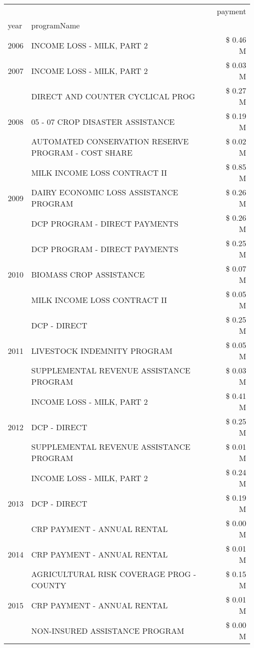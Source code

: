 \begin{tabular}{llr}
\toprule
 &  & payment \\
year & programName &  \\
\midrule
2006 & INCOME LOSS - MILK, PART 2 & \$ 0.46 M \\
\cline{1-3}
2007 & INCOME LOSS - MILK, PART 2 & \$ 0.03 M \\
\cline{1-3}
\multirow[t]{3}{*}{2008} & DIRECT AND COUNTER CYCLICAL PROG & \$ 0.27 M \\
 & 05 - 07 CROP DISASTER ASSISTANCE & \$ 0.19 M \\
 & AUTOMATED CONSERVATION RESERVE PROGRAM - COST SHARE & \$ 0.02 M \\
\cline{1-3}
\multirow[t]{3}{*}{2009} & MILK INCOME LOSS CONTRACT II & \$ 0.85 M \\
 & DAIRY ECONOMIC LOSS ASSISTANCE PROGRAM & \$ 0.26 M \\
 & DCP PROGRAM - DIRECT PAYMENTS & \$ 0.26 M \\
\cline{1-3}
\multirow[t]{3}{*}{2010} & DCP PROGRAM - DIRECT PAYMENTS & \$ 0.25 M \\
 & BIOMASS CROP ASSISTANCE & \$ 0.07 M \\
 & MILK INCOME LOSS CONTRACT II & \$ 0.05 M \\
\cline{1-3}
\multirow[t]{3}{*}{2011} & DCP - DIRECT & \$ 0.25 M \\
 & LIVESTOCK INDEMNITY PROGRAM & \$ 0.05 M \\
 & SUPPLEMENTAL REVENUE ASSISTANCE PROGRAM & \$ 0.03 M \\
\cline{1-3}
\multirow[t]{3}{*}{2012} & INCOME LOSS - MILK, PART 2 & \$ 0.41 M \\
 & DCP - DIRECT & \$ 0.25 M \\
 & SUPPLEMENTAL REVENUE ASSISTANCE PROGRAM & \$ 0.01 M \\
\cline{1-3}
\multirow[t]{3}{*}{2013} & INCOME LOSS - MILK, PART 2 & \$ 0.24 M \\
 & DCP - DIRECT & \$ 0.19 M \\
 & CRP PAYMENT - ANNUAL RENTAL & \$ 0.00 M \\
\cline{1-3}
2014 & CRP PAYMENT - ANNUAL RENTAL & \$ 0.01 M \\
\cline{1-3}
\multirow[t]{3}{*}{2015} & AGRICULTURAL RISK COVERAGE PROG - COUNTY & \$ 0.15 M \\
 & CRP PAYMENT - ANNUAL RENTAL & \$ 0.01 M \\
 & NON-INSURED ASSISTANCE PROGRAM & \$ 0.00 M \\
\cline{1-3}

\end{tabular}
